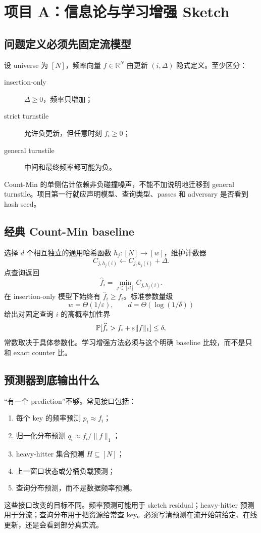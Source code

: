 \chapter{项目 A：信息论与学习增强 Sketch}

\section{问题定义必须先固定流模型}

设 universe 为 $[N]$，频率向量 $f\in\mathbb{R}^N$ 由更新 $(i,\Delta)$ 隐式定义。至少区分：
\begin{description}
  \item[insertion-only] $\Delta\ge0$，频率只增加；
  \item[strict turnstile] 允许负更新，但任意时刻 $f_i\ge0$；
  \item[general turnstile] 中间和最终频率都可能为负。
\end{description}
Count-Min 的单侧估计依赖非负碰撞噪声，不能不加说明地迁移到 general turnstile。项目第一行就应声明模型、查询类型、passes 和 adversary 是否看到 hash seed。

\section{经典 Count-Min baseline}

选择 $d$ 个相互独立的通用哈希函数 $h_j:[N]\to[w]$，维护计数器
\[
C_{j,h_j(i)}\leftarrow C_{j,h_j(i)}+\Delta.
\]
点查询返回
\[
\widehat f_i=\min_{j\in[d]} C_{j,h_j(i)}.
\]
在 insertion-only 模型下始终有 $\widehat f_i\ge f_i$。标准参数量级
\[
w=\Theta(1/\varepsilon),\qquad
d=\Theta(\log(1/\delta))
\]
给出对固定查询 $i$ 的高概率加性界
\[
\mathbb{P}[\widehat f_i>f_i+\varepsilon\lVert f\rVert_1]\le\delta,
\]
常数取决于具体参数化。学习增强方法必须与这个明确 baseline 比较，而不是只和 exact counter 比。

\section{预测器到底输出什么}

“有一个 prediction”不够。常见接口包括：
\begin{enumerate}
  \item 每个 key 的频率预测 $p_i\approx f_i$；
  \item 归一化分布预测 $q_i\approx f_i/\lVert f\rVert_1$；
  \item heavy-hitter 集合预测 $H\subseteq[N]$；
  \item 上一窗口状态或分桶负载预测；
  \item 查询分布预测，而不是数据频率预测。
\end{enumerate}
这些接口改变的目标不同。频率预测可能用于 sketch residual；heavy-hitter 预测用于分流；查询分布用于把资源给常查 key。必须写清预测在流开始前给定、在线更新，还是会看到部分真实流。

